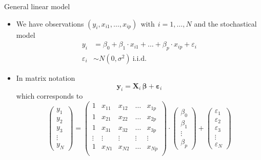 \documentclass[aspectratio=169]{beamer}
\newcommand{\vect}[1]{\mathbf{#1}}
\newcommand{\mat}[1]{\mathbf{#1}}
\newcommand{\gvect}[1]{\boldsymbol{#1}}
\begin{document}
\begin{frame}{General linear model}
  \begin{itemize}
    \item We have observations $(y_i, x_{i1}, \ldots, x_{ip}) ~~\text{with}~~ i = 1, \ldots, N$
and the stochastical model
\begin{align*}
  y_i & = \beta_0 + \beta_1 \cdot x_{i1} + \ldots + \beta_p \cdot x_{ip} +
        \varepsilon_i \\
  \varepsilon_i & \sim N (0, \sigma^2)~\text{i.i.d.}
\end{align*}

\vspace{-.4cm}
\item In matrix notation
\[
  \vect{y}_i = \mat{X}_i \, \gvect{\beta} + \gvect{\varepsilon}_i
\]
which corresponds to
\[
  \begin{pmatrix}
    y_1 \\
    y_2 \\
    y_3 \\
    \vdots \\
    y_N
  \end{pmatrix} = 
  \begin{pmatrix}
    1 & x_{11} & x_{12} & \dots & x_{1p} \\
    1 & x_{21} & x_{22} & \dots & x_{2p} \\
    1 & x_{31} & x_{32} & \dots & x_{3p} \\
    \vdots & \vdots & \vdots & \vdots & \vdots \\
    1 & x_{N1} & x_{N2} & \dots & x_{Np} \\
  \end{pmatrix} \cdot
  \begin{pmatrix}
    \beta_0 \\
    \beta_1 \\
    \vdots \\
    \beta_p
  \end{pmatrix} +
  \begin{pmatrix}
    \varepsilon_1 \\
    \varepsilon_2 \\
    \varepsilon_3 \\
    \vdots \\
    \varepsilon_N
  \end{pmatrix}
\]
  \end{itemize}
\end{frame}
\end{document}
